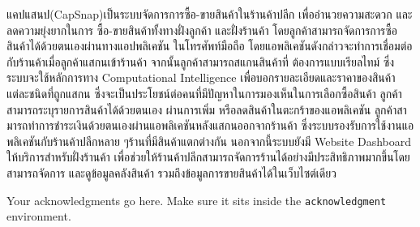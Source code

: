 \maketitle
\makesignature

\ifproject
\begin{abstractTH}
    \enskip    แคปแสนป(CapSnap)เป็นระบบจัดการการซื้อ-ขายสินค้าในร้านค้าปลีก เพื่ออำนวยความสะดวก และลดความยุ่งยากในการ
    ซื้อ-ขายสินค้าทั้งทางฝั่งลูกค้า และฝั่งร้านค้า โดยลูกค้าสามารถจัดการการซื้อสินค้าได้ด้วยตนเองผ่านทางแอปพลิเคชัน
    ในโทรศัพท์มือถือ โดยแอพลิเคชันดังกล่าวจะทำการเชื่อมต่อกับร้านค้าเมื่อลูกค้าแสกนเข้าร้านค้า จากนั้นลูกค้าสามารถสแกนสินค้าที่
    ต้องการแบบเรียลไทม์ ซึ่งระบบจะใช้หลักการทาง Computational Intelligence เพื่อบอกรายละเอียดและราคาของสินค้าแต่ละชนิดที่ถูกแสกน
    \enskip ซึ่งจะเป็นประโยชน์ต่อคนที่มีปัญหาในการมองเห็นในการเลือกซื้อสินค้า ลูกค้าสามารถระบุรายการสินค้าได้ด้วยตนเอง
    ผ่านการเพิ่ม หรือลดสินค้าในตะกร้าของแอพลิเคชัน ลูกค้าสามารถทําการชําระเงินด้วยตนเองผ่านแอพลิเคชันหลังแสกนออกจากร้านค้า 
    ซึ่งระบบรองรับการใช้งานแอพลิเคชันกับร้านค้าปลีกหลาย ๆร้านที่มีสินค้าแตกต่างกัน นอกจากนี้ระบบยังมี 
    \enskip Website Dashboard ให้บริการสําหรับฝั่งร้านค้า เพื่อช่วยให้ร้านค้าปลีกสามารถจัดการร้านได้อย่างมีประสิทธิภาพมากขึ้นโดยสามารถจัดการ 
    และดูข้อมูลคลังสินค้า รวมถึงข้อมูลการขายสินค้าได้ในเว็บไซต์เดียว
    
\end{abstractTH}



\iffalse
\begin{dedication}
This document is dedicated to all Chiang Mai University students.

Dedication page is optional.
\end{dedication}
\fi %

\begin{acknowledgments}
Your acknowledgments go here. Make sure it sits inside the
\texttt{acknowledgment} environment.

\end{acknowledgments}%
\fi %

\contentspage

\ifproject
\figurelistpage

\tablelistpage
\fi %



